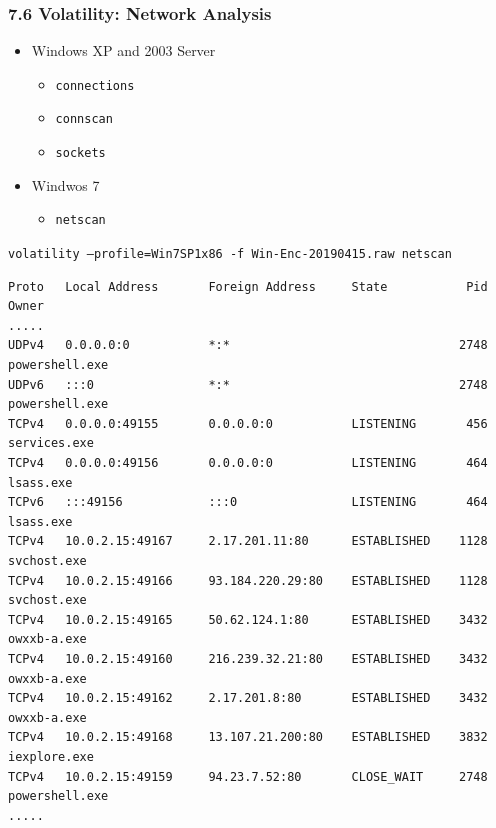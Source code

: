\begin{frame}[fragile]
  \frametitle{7.6 Volatility: Network Analysis}
    \begin{itemize}
        \item Windows XP and 2003 Server
            \begin{itemize}
                \item \texttt{connections}
                \item \texttt{connscan}
                \item \texttt{sockets}
            \end{itemize}
        \item Windwos 7
            \begin{itemize}
                \item \texttt{netscan}
            \end{itemize}
    \end{itemize}
    \texttt{\footnotesize volatility --profile=Win7SP1x86 -f Win-Enc-20190415.raw netscan}
    \begin{lstlisting}[basicstyle=\tiny]
Proto   Local Address       Foreign Address     State           Pid     Owner
.....
UDPv4   0.0.0.0:0           *:*                                2748     powershell.exe 
UDPv6   :::0                *:*                                2748     powershell.exe
TCPv4   0.0.0.0:49155       0.0.0.0:0           LISTENING       456     services.exe
TCPv4   0.0.0.0:49156       0.0.0.0:0           LISTENING       464     lsass.exe
TCPv6   :::49156            :::0                LISTENING       464     lsass.exe
TCPv4   10.0.2.15:49167     2.17.201.11:80      ESTABLISHED    1128     svchost.exe
TCPv4   10.0.2.15:49166     93.184.220.29:80    ESTABLISHED    1128     svchost.exe
TCPv4   10.0.2.15:49165     50.62.124.1:80      ESTABLISHED    3432     owxxb-a.exe
TCPv4   10.0.2.15:49160     216.239.32.21:80    ESTABLISHED    3432     owxxb-a.exe
TCPv4   10.0.2.15:49162     2.17.201.8:80       ESTABLISHED    3432     owxxb-a.exe
TCPv4   10.0.2.15:49168     13.107.21.200:80    ESTABLISHED    3832     iexplore.exe
TCPv4   10.0.2.15:49159     94.23.7.52:80       CLOSE_WAIT     2748     powershell.exe
.....
    \end{lstlisting}
\end{frame}


